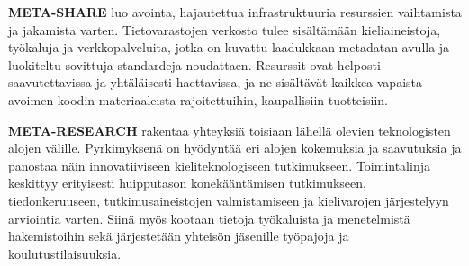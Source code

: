 \begin{multicols}{2}
\textbf{META-SHARE} luo avointa, hajautettua infrastruktuuria resurssien vaihtamista ja jakamista varten. Tietovarastojen verkosto tulee sisältämään kieliaineistoja, työkaluja ja verkkopalveluita, jotka on kuvattu laadukkaan metadatan avulla ja luokiteltu sovittuja standardeja noudattaen. Resurssit ovat helposti saavutettavissa ja yhtäläisesti haettavissa, ja ne sisältävät kaikkea vapaista avoimen koodin materiaaleista rajoitettuihin, kaupallisiin tuotteisiin.

\textbf{META-RESEARCH} rakentaa yhteyksiä toisiaan lähellä olevien teknologisten alojen välille. Pyrkimyksenä on hyödyntää eri alojen kokemuksia ja saavutuksia ja panostaa näin innovatiiviseen kieliteknologiseen tutkimukseen. Toimintalinja keskittyy erityisesti huipputason konekääntämisen tutkimukseen, tiedonkeruuseen, tutkimusaineistojen valmistamiseen ja kielivarojen järjestelyyn arviointia varten. Siinä myös kootaan tietoja työkaluista ja menetelmistä hakemistoihin sekä järjestetään yhteisön jäsenille työpajoja ja koulutustilaisuuksia.



\end{multicols}
